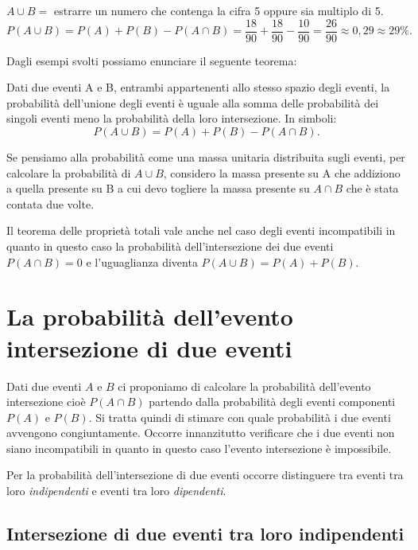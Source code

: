 \begin{exrig}
\begin{esempio}
$A\cup B =$ estrarre un numero che contenga la cifra 5 oppure sia multiplo di 
5. 
\[ P(A\cup B)=P(A)+P(B)-P(A\cap 
B)=\frac{18}{90}+\frac{18}{90}-\frac{10}{90}=\frac{26}{90}\approx 0,29\approx 
29\%. \]
\end{esempio}
\end{exrig}

Dagli esempi svolti possiamo enunciare il seguente teorema:

\begin{teorema}
Dati due eventi A e B, entrambi appartenenti allo stesso spazio degli eventi, 
la 
probabilità dell'unione degli eventi è uguale alla somma delle probabilità dei 
singoli eventi meno la probabilità della loro intersezione.
In simboli: \[ P(A\cup B)=P(A)+P(B)-P(A\cap B). \]
\end{teorema}
Se pensiamo alla probabilità come una massa unitaria distribuita sugli eventi, 
per calcolare la probabilità di $A\cup B$, considero la massa presente su A che 
addiziono a quella presente su B a cui devo togliere la massa presente su 
$A\cap 
B$ che è stata contata due volte.

\osservazione Il teorema delle proprietà totali vale anche nel caso degli 
eventi 
incompatibili in quanto in questo caso la probabilità dell'intersezione dei due 
eventi $P(A\cap B)=0$ e l'uguaglianza diventa $P(A\cup B)=P(A)+P(B)$.


\section{La probabilità dell'evento intersezione di due eventi}
\label{sec:04_intersezione}

Dati due eventi $A$ e $B$ ci proponiamo di calcolare la probabilità 
dell'evento intersezione cioè $P(A\cap B)$ partendo dalla probabilità degli 
eventi componenti $ P(A) $ e $ P(B) $. Si tratta quindi di stimare con quale 
probabilità i due eventi avvengono congiuntamente. Occorre innanzitutto 
verificare che i due eventi non siano incompatibili in quanto in questo caso 
l'evento intersezione è impossibile.

Per la probabilità dell'intersezione di due eventi occorre distinguere tra 
eventi tra loro \emph{indipendenti} e eventi tra loro \emph{dipendenti}.

\subsection{Intersezione di due eventi tra loro indipendenti}

